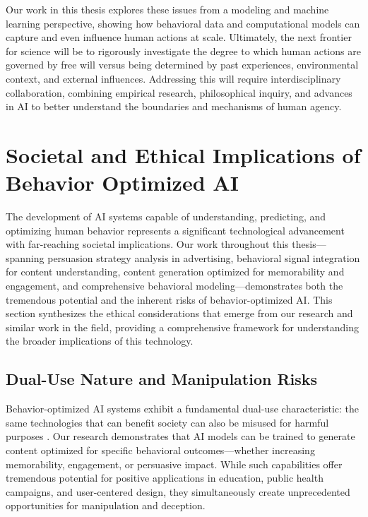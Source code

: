 \begin{enumerate}
    Our work in this thesis explores these issues from a modeling and machine learning perspective, showing how behavioral data and computational models can capture and even influence human actions at scale. Ultimately, the next frontier for science will be to rigorously investigate the degree to which human actions are governed by free will versus being determined by past experiences, environmental context, and external influences. Addressing this will require interdisciplinary collaboration, combining empirical research, philosophical inquiry, and advances in AI to better understand the boundaries and mechanisms of human agency.



\end{enumerate}


\section{Societal and Ethical Implications of Behavior Optimized AI}

The development of AI systems capable of understanding, predicting, and optimizing human behavior represents a significant technological advancement with far-reaching societal implications. Our work throughout this thesis—spanning persuasion strategy analysis in advertising, behavioral signal integration for content understanding, content generation optimized for memorability and engagement, and comprehensive behavioral modeling—demonstrates both the tremendous potential and the inherent risks of behavior-optimized AI. This section synthesizes the ethical considerations that emerge from our research and similar work in the field, providing a comprehensive framework for understanding the broader implications of this technology.

\subsection{Dual-Use Nature and Manipulation Risks}

Behavior-optimized AI systems exhibit a fundamental dual-use characteristic: the same technologies that can benefit society can also be misused for harmful purposes \cite{singh2024measuring,khurana2023behavior}. Our research demonstrates that AI models can be trained to generate content optimized for specific behavioral outcomes—whether increasing memorability, engagement, or persuasive impact. While such capabilities offer tremendous potential for positive applications in education, public health campaigns, and user-centered design, they simultaneously create unprecedented opportunities for manipulation and deception.

